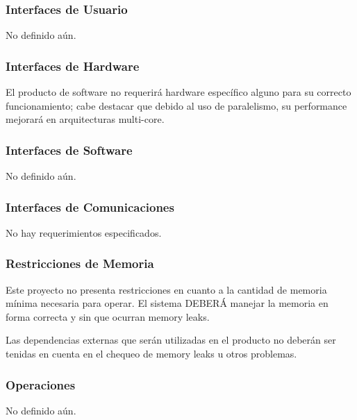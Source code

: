 \documentclass[10pt,a4paper,english,spanish]{article}
\begin{document}
	\subsubsection{Interfaces de Usuario}		
		No definido aún.		

	\subsubsection{Interfaces de Hardware}
		El producto de software no requerirá hardware específico alguno para su correcto funcionamiento; cabe destacar 			que debido al uso de paralelismo, su performance mejorará en arquitecturas multi-core.

	\subsubsection{Interfaces de Software}
		No definido aún.

	\subsubsection{Interfaces de Comunicaciones}
		No hay requerimientos especificados.

	\subsubsection{Restricciones de Memoria}	
		\par Este proyecto no presenta restricciones en cuanto a la cantidad de memoria mínima necesaria para operar. El 			sistema DEBERÁ manejar la memoria en forma correcta y sin que ocurran memory leaks.
		\par Las dependencias externas que serán utilizadas en el producto no deberán ser tenidas en cuenta en el chequeo 
		de memory leaks u otros problemas.
		
	\subsubsection{Operaciones}
		No definido aún.		
\end{document}
